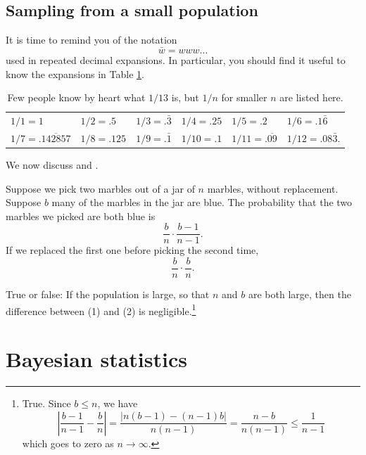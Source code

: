 
\subsection{Sampling from a small population}
\label{smallPop}

It is time to remind you of the notation
\[
	\bar w = www\dots
\]
used in repeated decimal expansions.
In particular, you should find it useful to know the expansions in Table \ref{142857}.
\begin{table}
\centering
\begin{tabular}{| l | l | l | l | l | l |} %
\hline
	$1/1=1$	& $1/2=.5$ 			&  $1/3=.\bar 3$	&  $1/4=.25$	& $1/5=.2$ 	& $1/6=.1\bar 6$ \\
	$1/7=.\overline{142857}$ 	& $1/8=.125$		& $1/9=.\bar 1$	& $1/10 = .1$	& $1/11=.\overline{09}$	& $1/12=.08\bar 3$.\\
\hline
\end{tabular}
\caption{Few people know by heart what $1/13$ is, but $1/n$ for smaller $n$ are listed here.}\label{142857}
\end{table}


We now discuss  and .

Suppose we pick two marbles out of a jar of $n$ marbles, without replacement. Suppose $b$ many of the marbles in the jar are blue.
The probability that the two marbles we picked are both blue is
\[
	\frac{b}{n}\cdot \frac{b-1}{n-1}.\tag{1}
\]
If we replaced the first one before picking the second time,
\[
	\frac{b}{n}\cdot \frac{b}{n}.\tag{2}
\]
\begin{exercise}
True or false: If the population is large, so that $n$ and $b$ are both large, then the difference between (1) and (2) is negligible.\footnote{
True. Since $b\le n$, we have
\[
	\left | \frac{b-1}{n-1}  - \frac{b}{n} \right| = \frac{|n(b-1)-(n-1)b|}{n(n-1)} = \frac{n-b}{n(n-1)} \le \frac{1}{n-1}
\]
which goes to zero as $n\to\infty$.
}
\end{exercise}


\section{Bayesian statistics}


